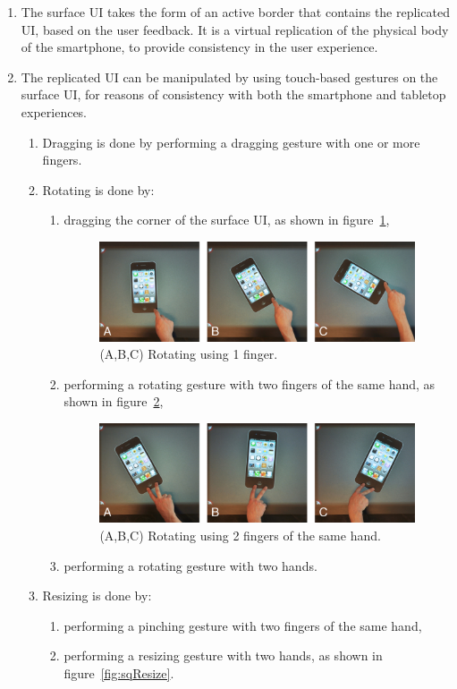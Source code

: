 \begin{enumerate}[{DD}-1]
\item The surface UI takes the form of an active border that contains the replicated UI, based on the user feedback.
It is a virtual replication of the physical body of the smartphone, to provide consistency in the user experience.
\item The replicated UI can be manipulated by using touch-based gestures on the surface UI, for reasons of consistency with both the smartphone and tabletop experiences.
	\begin{enumerate}[{DD-2}a]
	\item Dragging is done by performing a dragging gesture with one or more fingers.
	\item Rotating is done by:
		\begin{enumerate}[1{.}]
		\item dragging the corner of the surface UI, as shown in figure~\ref{fig:sq1f},

\begin{figure}[htb]
  \centering
    \includegraphics[width=0.7\linewidth]{images/sq1f}
  \caption{(A,B,C) Rotating using 1 finger.}
  \label{fig:sq1f}
\end{figure}

		\item performing a rotating gesture with two fingers of the same hand, as shown in figure~\ref{fig:sq2f1h},

\begin{figure}[htb]
  \centering
    \includegraphics[width=0.7\linewidth]{images/sq2f1h}
  \caption{(A,B,C) Rotating using 2 fingers of the same hand.}
  \label{fig:sq2f1h}
\end{figure}

		\item performing a rotating gesture with two hands.
		\end{enumerate}
	\item Resizing is done by:
		\begin{enumerate}[1{.}]
		\item performing a pinching gesture with two fingers of the same hand,
		\item performing a resizing gesture with two hands, as shown in figure~\ref{fig:sqResize}.
		

\end{enumerate}
\end{enumerate}
\end{enumerate}
